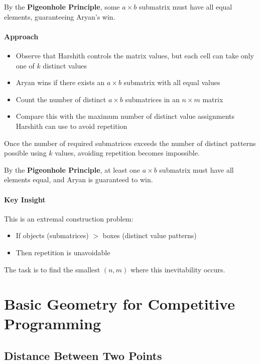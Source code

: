 \documentclass[11pt]{article}
\begin{document}
By the \textbf{Pigeonhole Principle}, some $a \times b$ submatrix must have
all equal elements, guaranteeing Aryan’s win.

\paragraph{Approach}

\begin{itemize}
    \item Observe that Harshith controls the matrix values, but each cell can take
    only one of $k$ distinct values
    \item Aryan wins if there exists an $a \times b$ submatrix with all equal values
    \item Count the number of distinct $a \times b$ submatrices in an $n \times m$ matrix
    \item Compare this with the maximum number of distinct value assignments Harshith
    can use to avoid repetition
\end{itemize}

Once the number of required submatrices exceeds the number of distinct patterns
possible using $k$ values, avoiding repetition becomes impossible.

By the \textbf{Pigeonhole Principle}, at least one $a \times b$ submatrix
must have all elements equal, and Aryan is guaranteed to win.


\paragraph{Key Insight}

This is an extremal construction problem:
\begin{itemize}
    \item If objects (submatrices) $>$ boxes (distinct value patterns)
    \item Then repetition is unavoidable
\end{itemize}

The task is to find the smallest $(n,m)$ where this inevitability occurs.

\section{Basic Geometry for Competitive Programming}

\subsection{Distance Between Two Points}
\end{document}
